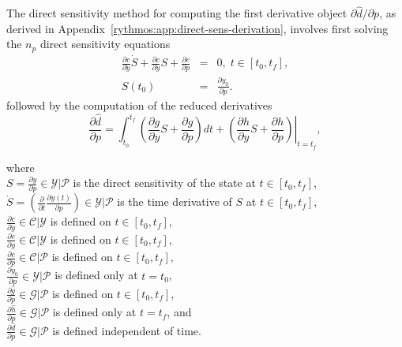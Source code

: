 \documentclass[pdf,ps2pdf,11pt]{SANDreport}
\begin{document}
The direct sensitivity method for computing the first derivative object
$\partial {}\hat{d} / {}\partial p$, as derived in
Appendix~\ref{rythmos:app:direct-sens-derivation}, involves first solving the
$n_p$ direct sensitivity equations
%
\begin{eqnarray}
%
\frac{\partial c}{\partial \dot{y}} \dot{S} + \frac{\partial c}{\partial y} S + \frac{\partial c}{\partial p}
& = & 0, \; t \in \left[ t_0, t_f \right], \label{rythmos:eqn:sens:direct-c} \\
S(t_0) & = & \frac{\partial y_0}{\partial p}. \label{rythmos:eqn:sens:direct-c:ic}
\end{eqnarray}
%
followed by the computation of the reduced derivatives
%
\begin{equation}
\frac{\partial \hat{d}}{\partial p} 
= \int_{t_0}^{t_f} \left( \frac{\partial g}{\partial y} S +  \frac{\partial g}{\partial p} \right) dt
+ \left. \left(  \frac{\partial h}{\partial y} S + \frac{\partial h}{\partial p} \right) \right|_{t=t_f},
\label{rythmos:eqn:sens:d_d_hat_d_p_2}
\end{equation}
%
\begin{tabbing}
\hspace{4ex}where\hspace{1ex}\= \\
\> $S = \frac{\partial y}{\partial p} {}\in {}\mathcal{Y}|\mathcal{P}$ is the
direct sensitivity of the state at $t\in[t_0,t_f]$, \\
\> $\dot{S} = \left(\frac{\partial}{\partial t} \frac{\partial y(t)}{\partial p}\right)
{}\in {}\mathcal{Y}|\mathcal{P}$ is the time derivative of $S$ at $t\in[t_0,t_f]$, \\
\> $\frac{\partial c}{\partial {}\dot{y}} {}\in {}\mathcal{C}|\mathcal{Y}$ is defined on
$t\in[t_0,t_f]$, \\
\> $\frac{\partial c}{\partial y} {}\in {}\mathcal{C}|\mathcal{Y}$ is defined on $t\in[t_0,t_f]$, \\
\> $\frac{\partial c}{\partial p} {}\in {}\mathcal{C}|\mathcal{P}$ is defined on $t\in[t_0,t_f]$, \\
\> $\frac{\partial y_0}{\partial p} {}\in {}\mathcal{Y}|\mathcal{P}$ is defined only at $t=t_0$, \\
\> $\frac{\partial {}\hat{g}}{\partial p} {}\in {}\mathcal{G}|\mathcal{P}$ is defined on $t\in[t_0,t_f]$, \\
\> $\frac{\partial {}\hat{h}}{\partial p} {}\in {}\mathcal{G}|\mathcal{P}$ is defined only at $t=t_f$, and \\
\> $\frac{\partial {}\hat{d}}{\partial p} {}\in {}\mathcal{G}|\mathcal{P}$ is defined independent of time.
\end{tabbing}
\end{document}
